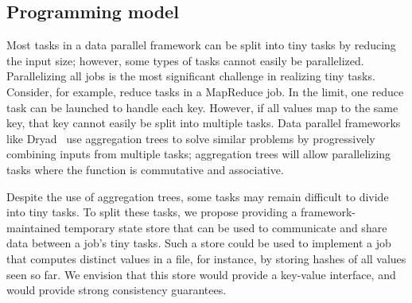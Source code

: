 \subsection{Programming model}
\label{sec:prog}
Most tasks in a data parallel framework can be split into tiny tasks by
reducing the input size; however, some types of tasks cannot easily be
parallelized. Parallelizing all jobs is the most significant challenge
in realizing tiny tasks. 
Consider, for example, reduce tasks in a MapReduce job. In the limit,
one reduce task can be launched to handle each key. However, if all
values map to the same key, that key cannot easily be split into multiple
tasks.
Data parallel frameworks like Dryad~\cite{yu2008dryadlinq} use aggregation trees to solve
similar problems by progressively combining inputs from multiple tasks;
aggregation trees will allow parallelizing tasks where the function
is commutative and associative.



Despite the use of aggregation trees, some tasks may remain
difficult to divide into tiny tasks. 
To split these tasks, we propose providing a framework-maintained
temporary state store that can be used to communicate and share data between a
job's tiny tasks. Such a store could be used to implement a job that computes
distinct values in a file, for instance, by storing hashes of all values
seen so far. We envision that this store would provide a key-value interface,
and would provide strong consistency guarantees.

